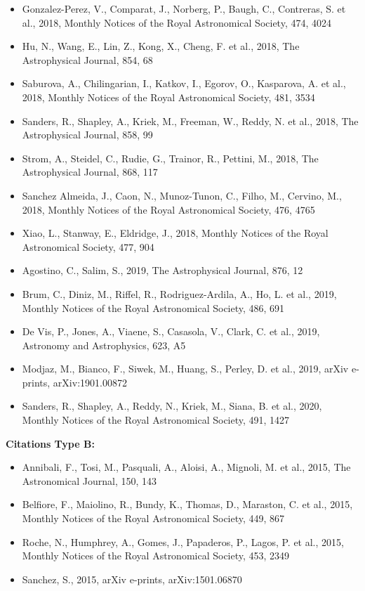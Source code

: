 \documentclass{letter}
\begin{document}
\begin{enumerate}
\begin{itemize}
\item Gonzalez-Perez, V., Comparat, J., Norberg, P., Baugh, C., Contreras, S. et al., 2018, Monthly Notices of the Royal Astronomical Society, 474, 4024
\item Hu, N., Wang, E., Lin, Z., Kong, X., Cheng, F. et al., 2018, The Astrophysical Journal, 854, 68
\item Saburova, A., Chilingarian, I., Katkov, I., Egorov, O., Kasparova, A. et al., 2018, Monthly Notices of the Royal Astronomical Society, 481, 3534
\item Sanders, R., Shapley, A., Kriek, M., Freeman, W., Reddy, N. et al., 2018, The Astrophysical Journal, 858, 99
\item Strom, A., Steidel, C., Rudie, G., Trainor, R., Pettini, M., 2018, The Astrophysical Journal, 868, 117
\item Sanchez Almeida, J., Caon, N., Munoz-Tunon, C., Filho, M., Cervino, M., 2018, Monthly Notices of the Royal Astronomical Society, 476, 4765
\item Xiao, L., Stanway, E., Eldridge, J., 2018, Monthly Notices of the Royal Astronomical Society, 477, 904
\item Agostino, C., Salim, S., 2019, The Astrophysical Journal, 876, 12
\item Brum, C., Diniz, M., Riffel, R., Rodriguez-Ardila, A., Ho, L. et al., 2019, Monthly Notices of the Royal Astronomical Society, 486, 691
\item De Vis, P., Jones, A., Viaene, S., Casasola, V., Clark, C. et al., 2019, Astronomy and Astrophysics, 623, A5
\item Modjaz, M., Bianco, F., Siwek, M., Huang, S., Perley, D. et al., 2019, arXiv e-prints, arXiv:1901.00872
\item Sanders, R., Shapley, A., Reddy, N., Kriek, M., Siana, B. et al., 2020, Monthly Notices of the Royal Astronomical Society, 491, 1427
\end{itemize}
{\bf Citations Type B:}
\begin{itemize}
\item Annibali, F., Tosi, M., Pasquali, A., Aloisi, A., Mignoli, M. et al., 2015, The Astronomical Journal, 150, 143
\item Belfiore, F., Maiolino, R., Bundy, K., Thomas, D., Maraston, C. et al., 2015, Monthly Notices of the Royal Astronomical Society, 449, 867
\item Roche, N., Humphrey, A., Gomes, J., Papaderos, P., Lagos, P. et al., 2015, Monthly Notices of the Royal Astronomical Society, 453, 2349
\item Sanchez, S., 2015, arXiv e-prints, arXiv:1501.06870

\end{itemize}
\end{enumerate}
\end{document}
